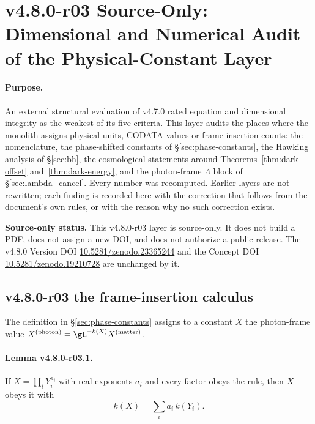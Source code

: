 
\clearpage
\section*{v4.8.0-r03 Source-Only: Dimensional and Numerical Audit of the Physical-Constant Layer}
\label{sec:v480-r03-dimensional-audit}

\paragraph{Purpose.}
An external structural evaluation of v4.7.0 rated equation and dimensional integrity as the
weakest of its five criteria.  This layer audits the places where the monolith assigns
physical units, CODATA values or frame-insertion counts: the nomenclature, the
phase-shifted constants of \S\ref{sec:phase-constants}, the Hawking analysis of
\S\ref{sec:bh}, the cosmological statements around
Theorems~\ref{thm:dark-offset} and~\ref{thm:dark-energy}, and the photon-frame
\(\Lambda\) block of \S\ref{sec:lambda_cancel}.  Every number was recomputed.  Earlier layers
are not rewritten; each finding is recorded here with the correction that follows from the
document's own rules, or with the reason why no such correction exists.

\noindent\textbf{Source-only status.}
This v4.8.0-r03 layer is source-only.  It does not build a PDF, does not assign a new DOI,
and does not authorize a public release.  The v4.8.0 Version DOI
\href{https://doi.org/10.5281/zenodo.23365244}{10.5281/zenodo.23365244} and the Concept DOI
\href{https://doi.org/10.5281/zenodo.19210728}{10.5281/zenodo.19210728} are unchanged by it.

\subsection*{v4.8.0-r03 the frame-insertion calculus}
\label{subsec:v480-r03-k-calculus}

The definition in \S\ref{sec:phase-constants} assigns to a constant \(X\) the photon-frame
value \(X^{(\mathrm{photon})}=\gL^{-k(X)}X^{(\mathrm{matter})}\).

\paragraph{Lemma v4.8.0-r03.1.}
If \(X=\prod_i Y_i^{a_i}\) with real exponents \(a_i\) and every factor obeys the rule, then
\(X\) obeys it with
\[
k(X)=\sum_i a_i\,k(Y_i).
\]

